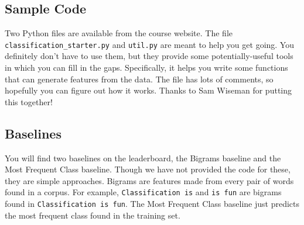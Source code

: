 \documentclass[12pt]{article}
\begin{document}
\subsection*{Sample Code}
Two Python files are available from the course website.  The file \verb|classification_starter.py| and \verb|util.py| are meant to help you get going.  You definitely don't have to use them, but they provide some potentially-useful tools in which you can fill in the gaps.  Specifically, it helps you write some functions that can generate features from the data.  The file has lots of comments, so hopefully you can figure out how it works. Thanks to Sam Wiseman for putting this together!

\subsection*{Baselines}
You will find two baselines on the leaderboard, the Bigrams baseline and the Most Frequent Class baseline. 
Though we have not provided the code for these, they are simple approaches.
Bigrams are features made from every pair of words found in a corpus.
For example, \texttt{Classification is} and \texttt{is fun} are bigrams found in \texttt{Classification is fun}.
The Most Frequent Class baseline just predicts the most frequent class found in the training set.
\end{document}
